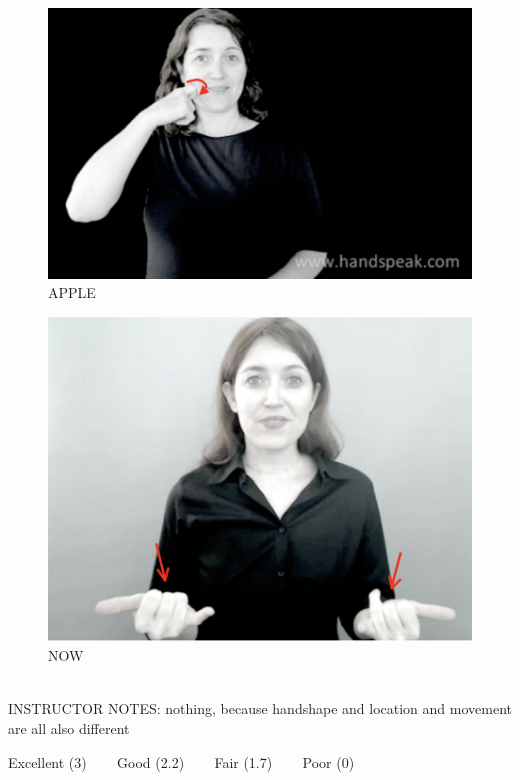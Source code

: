 \documentclass[12pt]{article}
\begin{document}
\begin{figure}[H]
\includegraphics{../images/asl_apple.png}
\caption{APPLE}
\end{figure}
\begin{figure}[H]
\includegraphics{../images/asl_now.png}
\caption{NOW}
\end{figure}

~\\
INSTRUCTOR NOTES: nothing, because handshape and location and movement are all also different


\vfill
Excellent (3) ~~~ Good (2.2) ~~~ Fair (1.7) ~~~ Poor (0)
\newpage

\begin{center}
\textbf{{\color{red}{\HUGE END OF EXAM}}}\\

\end{center}
\newpage
\end{document}

